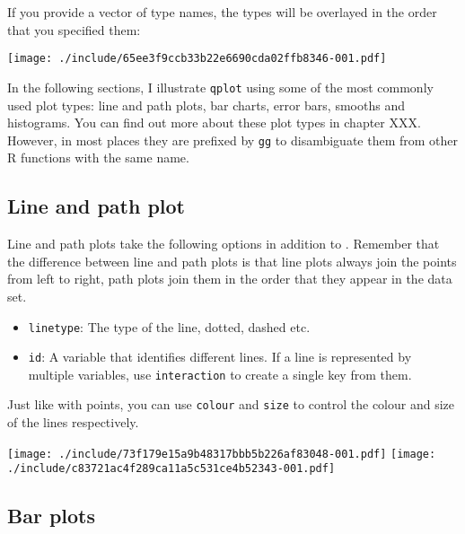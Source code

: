 If you provide a vector of type names, the types will be overlayed in the order that you specified them:

\texttt{[image: ./include/65ee3f9ccb33b22e6690cda02ffb8346-001.pdf]}

In the following sections, I illustrate {\tt qplot} using some of the most commonly used plot types: line and path plots, bar charts, error bars, smooths and histograms.  You can find out more about these plot types in chapter XXX.  However, in most places they are prefixed by {\tt gg} to disambiguate them from other R functions with the same name.

\subsection{Line and path plot}\label{sub:line_plot}

Line and path plots take the following options in addition to .  Remember that the difference between line and path plots is that line plots always join the points from left to right, path plots join them in the order that they appear in the data set.

\begin{itemize}
	\item {\tt linetype}: The type of the line, dotted, dashed etc.
	\item {\tt id}: A variable that identifies different lines.  If a line is represented by multiple variables, use {\tt interaction} to create a single key from them.
\end{itemize}

Just like with points, you can use {\tt colour} and {\tt size} to control the colour and size of the lines respectively.

\texttt{[image: ./include/73f179e15a9b48317bbb5b226af83048-001.pdf]}
\texttt{[image: ./include/c83721ac4f289ca11a5c531ce4b52343-001.pdf]}

\subsection{Bar plots}\label{sub:bar_plots}

